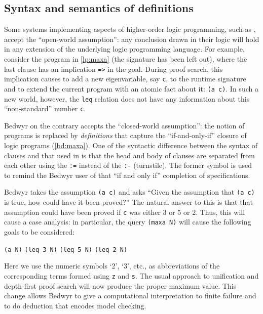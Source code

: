 \subsection{Syntax and semantics of definitions}

\lstset{style=lprolog}
\begin{figure}
  \centering
  
\end{figure}

Some systems implementing aspects of higher-order logic programming,
such as \lp{}, accept the ``open-world assumption'': any conclusion
drawn in their logic will hold in any extension of the underlying logic
programming language.  For example, consider the \lp{} program in
\autoref{lp:maxa} (the signature has been left out), where the last
clause has an implication \lstinline{=>} in the goal.  During proof
search, this implication causes \lp{} to add a new eigenvariable, say
\lstinline{c}, to the runtime signature and to extend the current
program with an atomic fact about it: \lstinline{(a c)}.  In such a new
world, however, the \lstinline{leq} relation does not have any
information about this ``non-standard'' number \lstinline{c}.
\lstset{style=bedwyr}

\begin{figure}
  \centering
  
\end{figure}

Bedwyr on the contrary accepts the ``closed-world assumption'': the
notion of programs is replaced by \emph{definitions} that capture the
``if-and-only-if'' closure of logic programs (\autoref{bd:maxa}).  One
of the syntactic difference between the syntax of clauses and that used
in \lp{} is that the head and body of clauses are separated from each
other using the \lstinline{:=} instead of the
\lstinline[style=lprolog]{:-} (turnstile).  The former symbol is used to
remind the Bedwyr user of that ``if and only if'' completion of
specifications.

Bedwyr takes the assumption \lstinline{(a c)} and asks ``Given the
assumption that \lstinline{(a c)} is true, how could have it been
proved?'' The natural answer to this is that that assumption could have
been proved if \lstinline{c} was either 3 or 5 or 2. Thus, this will
cause a case analysis: in particular, the query \lstinline{(maxa N)}
will cause the following goals to be considered:
\begin{center}
  \lstinline{(a N)}\qquad
  \lstinline{(leq 3 N)}\qquad
  \lstinline{(leq 5 N)}\qquad
  \lstinline{(leq 2 N)}
\end{center}
Here we use the numeric symbols `2', `3', etc., as abbreviations of the
corresponding terms formed using \lstinline{z} and \lstinline{s}.  The
usual approach to unification and depth-first proof search will now
produce the proper maximum value.  This change allows Bedwyr to give a
computational interpretation to finite failure and to do deduction that
encodes model checking.

